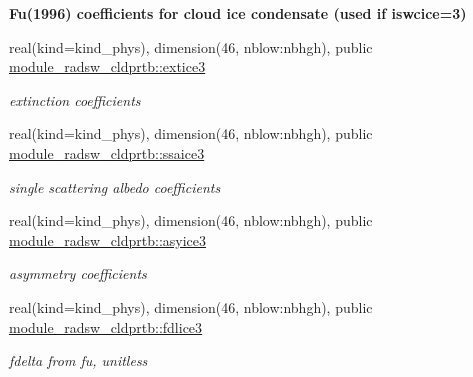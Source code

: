 \begin{Indent}\textbf{ Fu(1996) coefficients for cloud ice condensate (used if iswcice=3)}\par
\begin{DoxyCompactItemize}
\item 
\mbox{\label{namespacemodule__radsw__cldprtb_a8b8bae831aa5b460e260c94e7f24f4c7}} 
real(kind=kind\+\_\+phys), dimension(46, nblow\+:nbhgh), public \hyperlink{namespacemodule__radsw__cldprtb_a8b8bae831aa5b460e260c94e7f24f4c7}{module\+\_\+radsw\+\_\+cldprtb\+::extice3}
\begin{DoxyCompactList}\small\item\em extinction coefficients \end{DoxyCompactList}\item 
\mbox{\label{namespacemodule__radsw__cldprtb_a39b045b05e6bc9c04603277654ff8fc6}} 
real(kind=kind\+\_\+phys), dimension(46, nblow\+:nbhgh), public \hyperlink{namespacemodule__radsw__cldprtb_a39b045b05e6bc9c04603277654ff8fc6}{module\+\_\+radsw\+\_\+cldprtb\+::ssaice3}
\begin{DoxyCompactList}\small\item\em single scattering albedo coefficients \end{DoxyCompactList}\item 
\mbox{\label{namespacemodule__radsw__cldprtb_aec2685be0de3a557aca169062cf1055e}} 
real(kind=kind\+\_\+phys), dimension(46, nblow\+:nbhgh), public \hyperlink{namespacemodule__radsw__cldprtb_aec2685be0de3a557aca169062cf1055e}{module\+\_\+radsw\+\_\+cldprtb\+::asyice3}
\begin{DoxyCompactList}\small\item\em asymmetry coefficients \end{DoxyCompactList}\item 
\mbox{\label{namespacemodule__radsw__cldprtb_aa42cf6596d2dcd887864b1de40da3293}} 
real(kind=kind\+\_\+phys), dimension(46, nblow\+:nbhgh), public \hyperlink{namespacemodule__radsw__cldprtb_aa42cf6596d2dcd887864b1de40da3293}{module\+\_\+radsw\+\_\+cldprtb\+::fdlice3}
\begin{DoxyCompactList}\small\item\em fdelta from fu, unitless \end{DoxyCompactList}\end{DoxyCompactItemize}
\end{Indent}
